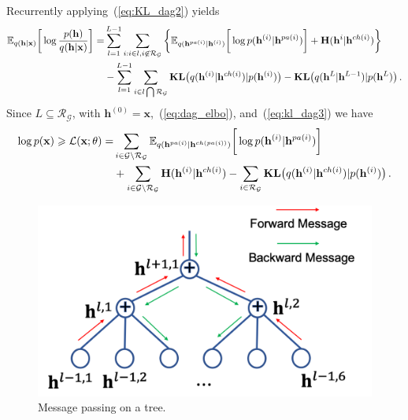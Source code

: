 \documentclass[twoside]{article}
\begin{document}
Recurrently applying~(\ref{eq:KL_dag2}) yields
\begin{align} \label{eq:kl_dag3}
 \mathbb{E}_{q(\mathbf{h} | \mathbf{x})} \bigg[ \log  \frac{p( \mathbf{h})}{q(\mathbf{h}|\mathbf{x})}  \bigg] =& \sum_{l=1}^{L-1}   \sum_{i:i\in l, i \not\in   \mathcal{R}_{ \mathcal{G}}  }  \bigg\{ \mathbb{E}_{q(\mathbf{h}^{pa(i)}|\mathbf{h}^{(i)})} \bigg[ \log p( \mathbf{h}^{(i)}|  \mathbf{h}^{pa(i)})   \bigg]  +    \textbf{\text{H}}(\mathbf{h}^i | \mathbf{h}^{ch(i)} )  \bigg\} \\ \notag
& -   \sum_{l=1}^{L-1}  \sum_{i \in l \bigcap \mathcal{R}_{ \mathcal{G} }  }  \textbf{\text{KL}}\big(q(\mathbf{h}^{(i)} | \mathbf{h}^{ch(i)} )   | p(\mathbf{h}^{(i)})  \big)   -   \textbf{\text{KL}}\big(q(\mathbf{h}^L | \mathbf{h}^{L-1} )   | p(\mathbf{h}^L)  \big) \, .
 \end{align}
Since $L  \subseteq   \mathcal{R}_{ \mathcal{G}} $,  with $\mathbf{h}^{(0)} = \mathbf{x}$,~(\ref{eq:dag_elbo}), and~(\ref{eq:kl_dag3}) we have 
\begin{align*}  
 \log p(\mathbf{x}) \geqslant  \mathcal{L}(\mathbf{x}; \theta) =&   \sum_{i \in \mathcal{G}  \setminus  \mathcal{R}_{ \mathcal{G} }  }  \mathbb{E}_{q(\mathbf{h}^{pa(i)}|\mathbf{h}^{ch(pa(i))})} \bigg[ \log p( \mathbf{h}^{(i)}|  \mathbf{h}^{pa(i)})   \bigg]  \\
 & +  \sum_{i \in \mathcal{G}  \setminus  \mathcal{R}_{ \mathcal{G} }  } \textbf{\text{H}}(\mathbf{h}^{(i)} | \mathbf{h}^{ch(i)} )   -    \sum_{i \in  \mathcal{R}_{ \mathcal{G} }  }  \textbf{\text{KL}}\big(q(\mathbf{h}^{(i)} | \mathbf{h}^{ch(i)} )   | p(\mathbf{h}^{(i)})  \big)  \, .
 \end{align*}




\begin{figure}[H]%
\begin{center}
 \includegraphics[width=0.5\linewidth]{fig/tree_message.png}
\end{center}
  \caption{Message passing on a tree.} 
\end{figure}
\end{document}
